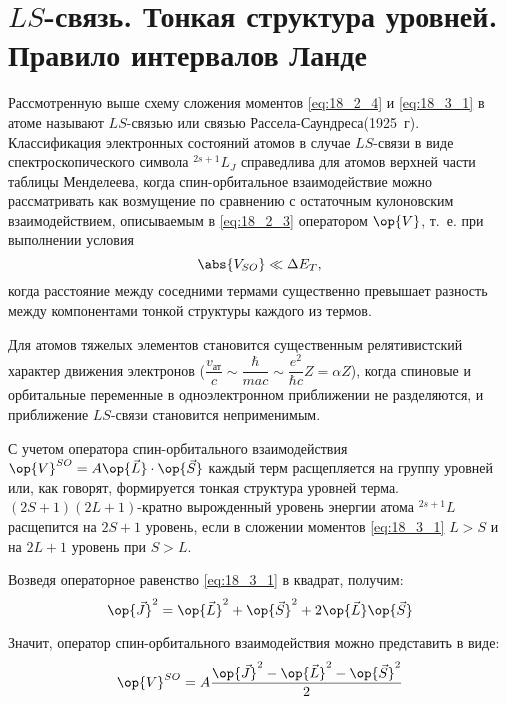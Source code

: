 \section{$LS$-связь. Тонкая структура уровней. Правило интервалов Ланде}

Рассмотренную выше схему сложения моментов \eqref{eq:18_2_4} и \eqref{eq:18_3_1} в атоме называют $LS$-связью  или связью Рассела-Саундреса\footnotemark (1925~г). Классификация электронных состояний атомов в случае $LS$-связи в виде спектроскопического символа $^{2s+1}L_J$ справедлива для атомов верхней части таблицы Менделеева\footnotemark, когда спин-орбитальное взаимодействие можно рассматривать как возмущение по сравнению с остаточным кулоновским взаимодействием, описываемым в \eqref{eq:18_2_3} оператором $\op{V}$, т.~е. при выполнении условия
%
\begin{equation}
\label{eq:18_4_1}
\abs{V_{SO}} \ll \Delta E_T,
\end{equation}
когда расстояние между соседними термами существенно превышает разность между компонентами тонкой структуры каждого из термов.
 
Для атомов тяжелых элементов становится существенным релятивистский характер движения электронов ($\dfrac{v_{\text{ат}}}{c} \sim \dfrac{\hbar}{m a c} \sim \dfrac{e^2}{\hbar c} Z = \alpha Z$), когда спиновые и орбитальные переменные в одноэлектронном приближении не разделяются, и приближение $LS$-связи становится неприменимым.

С учетом оператора спин-орбитального взаимодействия $\op{V}^{SO} = A \op{\vec{L}} \cdot \op{\vec{S}}$ каждый терм расщепляется на группу уровней или, как говорят, формируется тонкая структура уровней терма. $(2S + 1)(2L+1)$-кратно вырожденный уровень энергии атома $^{2s+1}L$ расщепится на $2S+1$ уровень, если в сложении моментов \eqref{eq:18_3_1} $L > S$ и на $2L+1$ уровень при $S > L$. 

Возведя операторное равенство \eqref{eq:18_3_1} в квадрат, получим:
$$
\op{\vec{J}}^2 = \op{\vec{L}}^2 + \op{\vec{S}}^2 + 2\op{\vec{L}}\op{\vec{S}}
$$

Значит, оператор спин-орбитального взаимодействия можно представить в виде:
\begin{equation}
\label{eq:18_4_2}
\op{V}^{SO} = A\frac{\op{\vec{J}}^2 - \op{\vec{L}}^2 - \op{\vec{S}}^2}{2}
\end{equation}

